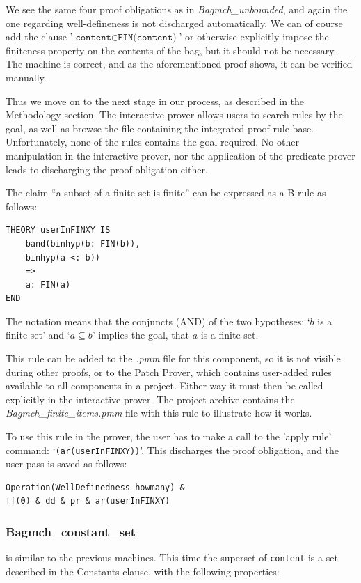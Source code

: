 \documentclass[12pt,journal,duplex]{IEEEtran}
\begin{document}
	We see the same four proof obligations as in \emph{Bagmch\_unbounded}, and again the one regarding well-defineness is not discharged automatically. We can of course add the clause '$\texttt{content} \in \texttt{FIN(content)}$' or otherwise explicitly impose the finiteness property on the contents of the bag, but it should not be necessary. The machine is correct, and as the aforementioned proof shows, it can be verified manually.

	Thus we move on to the next stage in our process, as described in the Methodology section. The interactive prover allows users to search rules by the goal, as well as browse the file containing the integrated proof rule base. Unfortunately, none of the rules contains the goal required. No other manipulation in the interactive prover, nor the application of the predicate prover leads to discharging the proof obligation either.

	The claim ``a subset of a finite set is finite'' can be expressed as a B rule as follows:

\begin{lstlisting}
THEORY userInFINXY IS
	band(binhyp(b: FIN(b)),
	binhyp(a <: b))
	=>
	a: FIN(a)
END
\end{lstlisting}

	The notation means that the conjuncts (AND) of the two hypotheses: `$b$ is a finite set' and `$a \subseteq b$' implies the goal, that $a$ is a finite set.

	This rule can be added to the \emph{.pmm} file for this component, so it is not visible during other proofs, or to the Patch Prover, which contains user-added rules available to all components in a project. Either way it must then be called explicitly in the interactive prover. The project archive contains the \emph{Bagmch\_finite\_items.pmm} file with this rule to illustrate how it works.

	To use this rule in the prover, the user has to make a call to the 'apply rule' command: `\texttt{(ar(userInFINXY))}'. This discharges the proof obligation, and the user pass is saved as follows:
\begin{lstlisting}
Operation(WellDefinedness_howmany) &
ff(0) & dd & pr & ar(userInFINXY)
\end{lstlisting}

	\subsubsection{Bagmch\_constant\_set} is similar to the previous machines. This time the superset of \texttt{content} is a set described in the Constants clause, with the following properties:
\end{document}
